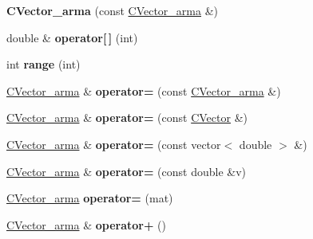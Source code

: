 \begin{DoxyCompactItemize}
\mbox{\label{class_c_vector__arma_a1f95f39443791667b0690f4f97a0507f}} 
{\bfseries C\+Vector\+\_\+arma} (const \hyperlink{class_c_vector__arma}{C\+Vector\+\_\+arma} \&)
\item 
\mbox{\label{class_c_vector__arma_a12399a7e01fd42340cdc7e10871e9ad0}} 
double \& {\bfseries operator\mbox{[}$\,$\mbox{]}} (int)
\item 
\mbox{\label{class_c_vector__arma_ab934472cec24ca9bf80530096b17f3f1}} 
int {\bfseries range} (int)
\item 
\mbox{\label{class_c_vector__arma_a6098c801303136fa4d8e9f5368474c98}} 
\hyperlink{class_c_vector__arma}{C\+Vector\+\_\+arma} \& {\bfseries operator=} (const \hyperlink{class_c_vector__arma}{C\+Vector\+\_\+arma} \&)
\item 
\mbox{\label{class_c_vector__arma_ab5212a2689e66d5c5bfc23f27f5a7744}} 
\hyperlink{class_c_vector__arma}{C\+Vector\+\_\+arma} \& {\bfseries operator=} (const \hyperlink{class_c_vector}{C\+Vector} \&)
\item 
\mbox{\label{class_c_vector__arma_ac9a878f4478f430c9bcd97ee0af51e92}} 
\hyperlink{class_c_vector__arma}{C\+Vector\+\_\+arma} \& {\bfseries operator=} (const vector$<$ double $>$ \&)
\item 
\mbox{\label{class_c_vector__arma_abb3b327b52a5801224fd2ac1a78b51ad}} 
\hyperlink{class_c_vector__arma}{C\+Vector\+\_\+arma} \& {\bfseries operator=} (const double \&v)
\item 
\mbox{\label{class_c_vector__arma_a2a1193788b4432b9a65e0efe46c09363}} 
\hyperlink{class_c_vector__arma}{C\+Vector\+\_\+arma} {\bfseries operator=} (mat)
\item 
\mbox{\label{class_c_vector__arma_aeb344931cc7d547f758aa397a76f2fd2}} 
\hyperlink{class_c_vector__arma}{C\+Vector\+\_\+arma} \& {\bfseries operator+} ()
\item 
\mbox{\label{class_c_vector__arma_ac375ee8f7f41648068ad213812ece672}} 

\end{DoxyCompactItemize}
